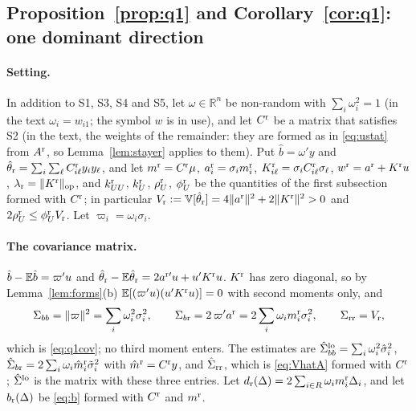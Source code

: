 \subsection{Proposition~\ref{prop:q1} and Corollary~\ref{cor:q1}: one dominant direction}

\paragraph{Setting.} In addition to S1, S3, S4 and S5, let $\omega\in\mathbb{R}^n$ be non-random with
$\sum_i\omega_i^2=1$ (in the text $\omega_i=w_{i1}$; the symbol $w$ is in use), and let $C^{\rm r}$ be a matrix that
satisfies S2 (in the text, the weights of the remainder: they are formed as in \eqref{eq:ustat} from $A^{\rm r}$,
so Lemma~\ref{lem:stayer} applies to them). Put $\hat b=\omega'y$ and
$\hat\theta_{\rm r}=\sum_i\sum_\ell C^{\rm r}_{i\ell}y_iy_\ell$, and let $m^{\rm r}=C^{\rm r}\mu$,
$a^{\rm r}_i=\sigma_im_i^{\rm r}$, $K^{\rm r}_{i\ell}=\sigma_iC^{\rm r}_{i\ell}\sigma_\ell$,
$w^{\rm r}=a^{\rm r}+K^{\rm r}u$, $\lambda_{\rm r}=\|K^{\rm r}\|_{\mathrm{op}}$, and $k^{\rm r}_{UU}$, $k^{\rm r}_U$,
$\rho^{\rm r}_U$, $\phi^{\rm r}_U$ be the quantities of the first subsection formed with $C^{\rm r}$; in particular
$V_{\rm r}:=\mathbb{V}[\hat\theta_{\rm r}]=4\|a^{\rm r}\|^2+2\|K^{\rm r}\|^2>0$ and $2\rho^{\rm r}_U\le\phi^{\rm r}_UV_{\rm r}$.
Let $\varpi_i=\omega_i\sigma_i$.

\paragraph{The covariance matrix.} $\hat b-\mathbb{E}\hat b=\varpi'u$ and
$\hat\theta_{\rm r}-\mathbb{E}\hat\theta_{\rm r}=2a^{{\rm r}\prime}u+u'K^{\rm r}u$. $K^{\rm r}$ has zero diagonal, so by
Lemma~\ref{lem:forms}(b) $\mathbb{E}[(\varpi'u)(u'K^{\rm r}u)]=0$ with second moments only, and
\[
\Sigma_{bb}=\|\varpi\|^2=\sum_i\omega_i^2\sigma_i^2,\qquad
\Sigma_{b{\rm r}}=2\,\varpi'a^{\rm r}=2\sum_i\omega_im_i^{\rm r}\sigma_i^2,\qquad \Sigma_{\rm rr}=V_{\rm r},
\]
which is \eqref{eq:q1cov}; no third moment enters. The estimates are
$\hat\Sigma_{bb}^{\rm lo}=\sum_i\omega_i^2\hat\sigma_i^2$,
$\hat\Sigma_{b{\rm r}}=2\sum_i\omega_i\hat m_i^{\rm r}\tilde\sigma_i^2$ with $\hat m^{\rm r}=C^{\rm r}y$, and
$\hat\Sigma_{\rm rr}$, which is \eqref{eq:VhatA} formed with $C^{\rm r}$; $\hat\Sigma^{\rm lo}$ is the matrix with
these three entries. Let
$d_{\rm r}(\Delta)=2\sum_{i\in R}\omega_im_i^{\rm r}\Delta_i$, and let $b_{\rm r}(\Delta)$ be \eqref{eq:b} formed with
$C^{\rm r}$ and $m^{\rm r}$.

